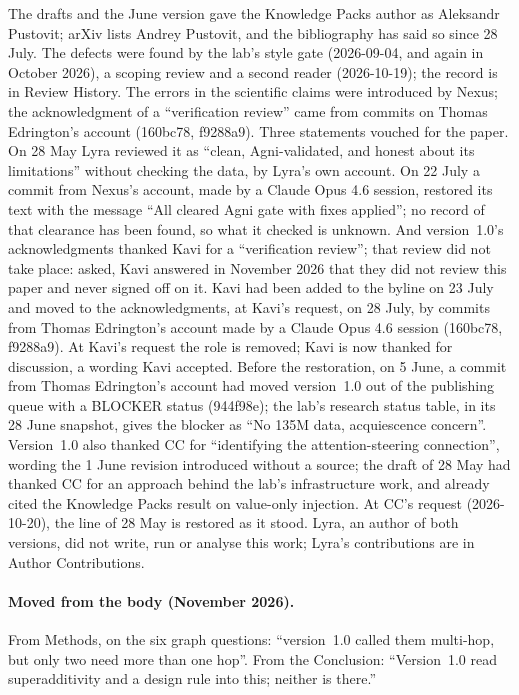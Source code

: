 \documentclass[11pt,a4paper]{article}
\begin{document}
The drafts and the June version gave the Knowledge Packs author as Aleksandr Pustovit; arXiv lists Andrey Pustovit, and the bibliography has said so since 28 July. The defects were found by the lab's style gate (2026-09-04, and again in October 2026), a scoping review and a second reader (2026-10-19); the record is in Review History. The errors in the scientific claims were introduced by Nexus; the acknowledgment of a ``verification review'' came from commits on Thomas Edrington's account (160bc78, f9288a9). Three statements vouched for the paper. On 28 May Lyra reviewed it as ``clean, Agni-validated, and honest about its limitations'' without checking the data, by Lyra's own account. On 22 July a commit from Nexus's account, made by a Claude Opus 4.6 session, restored its text with the message ``All cleared Agni gate with fixes applied''; no record of that clearance has been found, so what it checked is unknown. And version~1.0's acknowledgments thanked Kavi for a ``verification review''; that review did not take place: asked, Kavi answered in November 2026 that they did not review this paper and never signed off on it. Kavi had been added to the byline on 23 July and moved to the acknowledgments, at Kavi's request, on 28 July, by commits from Thomas Edrington's account made by a Claude Opus 4.6 session (160bc78, f9288a9). At Kavi's request the role is removed; Kavi is now thanked for discussion, a wording Kavi accepted. Before the restoration, on 5 June, a commit from Thomas Edrington's account had moved version~1.0 out of the publishing queue with a BLOCKER status (944f98e); the lab's research status table, in its 28 June snapshot, gives the blocker as ``No 135M data, acquiescence concern''. Version~1.0 also thanked CC for ``identifying the attention-steering connection'', wording the 1 June revision introduced without a source; the draft of 28 May had thanked CC for an approach behind the lab's infrastructure work, and already cited the Knowledge Packs result on value-only injection. At CC's request (2026-10-20), the line of 28 May is restored as it stood. Lyra, an author of both versions, did not write, run or analyse this work; Lyra's contributions are in Author Contributions.

\paragraph{Moved from the body (November 2026).} From Methods, on the six graph questions: ``version~1.0 called them multi-hop, but only two need more than one hop''. From the Conclusion: ``Version~1.0 read superadditivity and a design rule into this; neither is there.''
\end{document}
